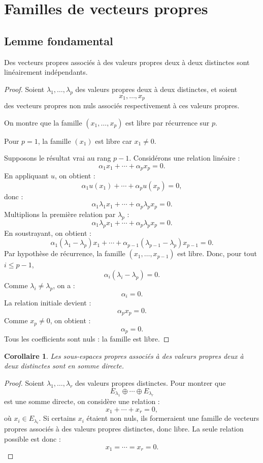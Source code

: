 \documentclass[11pt,a4paper]{article}
\newtheorem{corollaire}[prop]{Corollaire}
\begin{document}
\section{Familles de vecteurs propres}

\subsection{Lemme fondamental}

\begin{theorembox}
Des vecteurs propres associés à des valeurs propres deux à deux distinctes sont linéairement indépendants.
\end{theorembox}

\begin{proof}
Soient \(\lambda_1,\dots,\lambda_p\) des valeurs propres deux à deux distinctes, et soient
\[
x_1,\dots,x_p
\]
des vecteurs propres non nuls associés respectivement à ces valeurs propres.

On montre que la famille \((x_1,\dots,x_p)\) est libre par récurrence sur \(p\).

Pour \(p=1\), la famille \((x_1)\) est libre car \(x_1\neq0\).

Supposons le résultat vrai au rang \(p-1\).  
Considérons une relation linéaire :
\[
\alpha_1x_1+\cdots+\alpha_px_p=0.
\]
En appliquant \(u\), on obtient :
\[
\alpha_1u(x_1)+\cdots+\alpha_pu(x_p)=0,
\]
donc :
\[
\alpha_1\lambda_1x_1+\cdots+\alpha_p\lambda_px_p=0.
\]
Multiplions la première relation par \(\lambda_p\) :
\[
\alpha_1\lambda_px_1+\cdots+\alpha_p\lambda_px_p=0.
\]
En soustrayant, on obtient :
\[
\alpha_1(\lambda_1-\lambda_p)x_1+\cdots+
\alpha_{p-1}(\lambda_{p-1}-\lambda_p)x_{p-1}=0.
\]
Par hypothèse de récurrence, la famille \((x_1,\dots,x_{p-1})\) est libre.  
Donc, pour tout \(i\leq p-1\),
\[
\alpha_i(\lambda_i-\lambda_p)=0.
\]
Comme \(\lambda_i\neq\lambda_p\), on a :
\[
\alpha_i=0.
\]
La relation initiale devient :
\[
\alpha_px_p=0.
\]
Comme \(x_p\neq0\), on obtient :
\[
\alpha_p=0.
\]
Tous les coefficients sont nuls : la famille est libre.
\end{proof}

\begin{corollaire}
Les sous-espaces propres associés à des valeurs propres deux à deux distinctes sont en somme directe.
\end{corollaire}

\begin{proof}
Soient \(\lambda_1,\dots,\lambda_r\) des valeurs propres distinctes.  
Pour montrer que
\[
E_{\lambda_1}\oplus\cdots\oplus E_{\lambda_r}
\]
est une somme directe, on considère une relation :
\[
x_1+\cdots+x_r=0,
\]
où \(x_i\in E_{\lambda_i}\).  
Si certains \(x_i\) étaient non nuls, ils formeraient une famille de vecteurs propres associés à des valeurs propres distinctes, donc libre.  
La seule relation possible est donc :
\[
x_1=\cdots=x_r=0.
\]
\end{proof}
\end{document}
